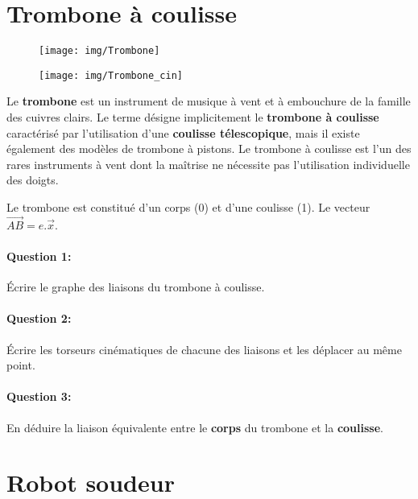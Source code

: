 

\section{Trombone à coulisse}

\begin{figure}[htbp]
\begin{minipage}{0.49\linewidth}
\texttt{[image: img/Trombone]}
\end{minipage}
\hfill
\begin{minipage}{0.48\linewidth}
\texttt{[image: img/Trombone\_cin]}
\end{minipage}
\end{figure}

Le \textbf{trombone} est un instrument de musique à vent et à embouchure de la famille des cuivres clairs. Le terme désigne implicitement le \textbf{trombone à coulisse} caractérisé par l'utilisation d'une \textbf{coulisse télescopique}, mais il existe également des modèles de trombone à pistons. Le trombone à coulisse est l'un des rares instruments à vent dont la maîtrise ne nécessite pas l'utilisation individuelle des doigts.

Le trombone est constitué d'un corps (0) et d'une coulisse (1). Le vecteur $\overrightarrow{AB}=e.\overrightarrow{x}$.

\paragraph{Question 1:} Écrire le graphe des liaisons du trombone à coulisse.

\paragraph{Question 2:} Écrire les torseurs cinématiques de chacune des liaisons et les déplacer au même point.

\paragraph{Question 3:} En déduire la liaison équivalente entre le \textbf{corps} du trombone et la \textbf{coulisse}.

\newpage

\section{Robot soudeur}

